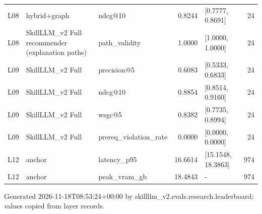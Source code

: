 \begin{table}[H]
\begin{tabular}{lllrlr}
L08 & hybrid+graph & ndcg@10 & 0.8244 & [0.7777, 0.8691] & 24 \\
L08 & SkillLLM\_v2 Full recommender (explanation paths) & path\_validity & 1.0000 & [1.0000, 1.0000] & 24 \\
L09 & SkillLLM\_v2 Full & precision@5 & 0.6083 & [0.5333, 0.6833] & 24 \\
L09 & SkillLLM\_v2 Full & ndcg@10 & 0.8854 & [0.8514, 0.9160] & 24 \\
L09 & SkillLLM\_v2 Full & wsgc@5 & 0.8382 & [0.7735, 0.8994] & 24 \\
L09 & SkillLLM\_v2 Full & prereq\_violation\_rate & 0.0000 & [0.0000, 0.0000] & 24 \\
L12 & anchor & latency\_p95 & 16.6614 & [15.1548, 18.3863] & 974 \\
L12 & anchor & peak\_vram\_gb & 18.4843 & - & 974 \\
\bottomrule
\end{tabular}
\par\smallskip\footnotesize Generated 2026-11-18T08:53:24+00:00 by skillllm\_v2.evals.research.leaderboard; values copied from layer records.
\end{table}
